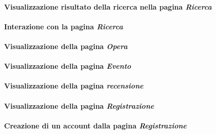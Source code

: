 \paragraph{Visualizzazione risultato della ricerca nella pagina \textit{Ricerca}}
\label{analisi-casi-uso-attori-principali-utente-generico-13}

\paragraph{Interazione con la pagina \textit{Ricerca}}
\label{analisi-casi-uso-attori-principali-utente-generico-14}

\paragraph{Visualizzazione della pagina \textit{Opera}}
\label{analisi-casi-uso-attori-principali-utente-generico-15}

\paragraph{Visualizzazione della pagina \textit{Evento}}
\label{analisi-casi-uso-attori-principali-utente-generico-16}

\paragraph{Visualizzazione della pagina \textit{recensione}}
\label{analisi-casi-uso-attori-principali-utente-generico-17}

\paragraph{Visualizzazione della pagina \textit{Registrazione}}
\label{analisi-casi-uso-attori-principali-utente-generico-18}

\paragraph{Creazione di un account dalla pagina \textit{Registrazione}}
\label{analisi-casi-uso-attori-principali-utente-generico-19}

